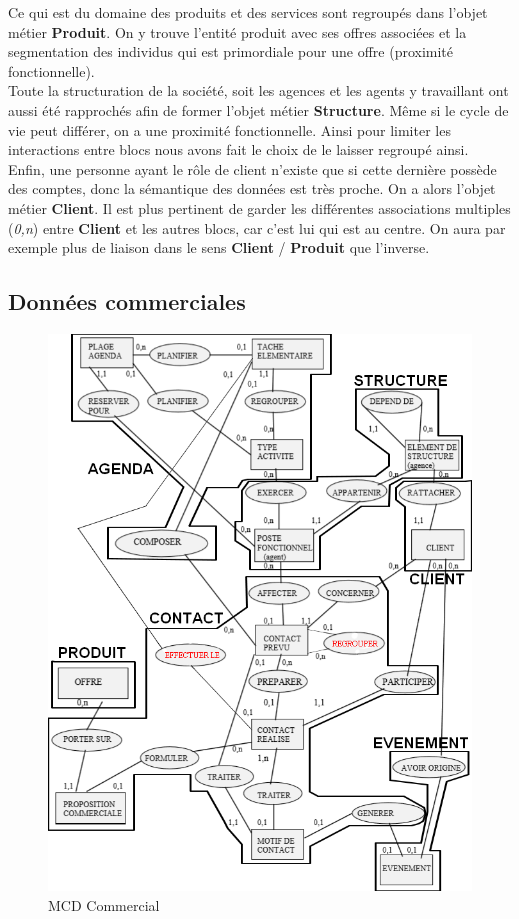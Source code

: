 Ce qui est du domaine des produits et des services sont regroupés dans l'objet métier \textbf{Produit}. On y trouve l'entité produit avec ses offres associées et la segmentation des individus qui est primordiale pour une offre (proximité fonctionnelle). \\

Toute la structuration de la société, soit les agences et les agents y travaillant ont aussi été rapprochés afin de former l'objet métier \textbf{Structure}. Même si le cycle de vie peut différer, on a une proximité fonctionnelle. Ainsi pour limiter les interactions entre blocs nous avons fait le choix de le laisser regroupé ainsi. \\

Enfin, une personne ayant le rôle de client n'existe que si cette dernière possède des comptes, donc la sémantique des données est très proche. On a alors l'objet métier \textbf{Client}. Il est plus pertinent de garder les différentes associations multiples (\textit{0,n}) entre \textbf{Client} et les autres blocs, car c'est lui qui est au centre. On aura par exemple plus de liaison dans le sens \textbf{Client} / \textbf{Produit} que l'inverse.

\subsection{Données commerciales}

\begin{figure}[H]
\centering
\includegraphics[width=\textwidth]{figures/mcd/MCD_Commercial}
\caption{MCD Commercial}
\end{figure}

